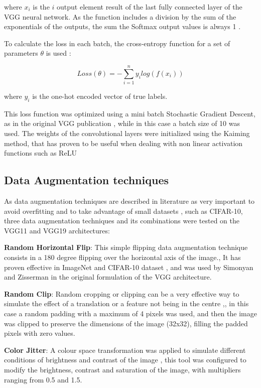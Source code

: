 \documentclass[10pt,twocolumn,letterpaper]{article}
\begin{document}
where $x_i$ is the $i$ output element result of the last fully connected layer of the VGG neural network. As the function includes a division by the sum of the exponentials of the outputs, the sum the Softmax output values is always 1 \cite{Skansi2018}.

To calculate the loss in each batch, the cross-entropy function for a set of parameters $\theta$ is used \cite{Hastie2009}:

\begin{equation}
	{Loss}(\theta) = - \sum_{i=1}^{n} y_i log(f(x_i))
\end{equation}

where $y_i$ is the one-hot encoded vector of true labels. 

This loss function was optimized using a mini batch Stochastic Gradient Descent, as in the original VGG publication \cite{Simonyan2015}, while in this case a batch size of 10 was used. The weights of the convolutional layers were initialized using the Kaiming method, that has proven to be useful when dealing with non linear activation functions such as ReLU \cite{He2015}

\subsection{Data Augmentation techniques}

As data augmentation techniques are described in literature as very important to avoid overfitting and to take advantage of small datasets \cite{Shorten2019}, such as CIFAR-10, three data augmentation techniques and its combinations were tested on the VGG11 and VGG19 architectures:

\textbf{Random Horizontal Flip}: This simple flipping data augmentation technique consists in a 180 degree flipping over the horizontal axis of the image., It has proven effective in ImageNet and CIFAR-10 dataset \cite{Shorten2019}, and was used by Simonyan and Zisserman \cite{Simonyan2015} in the original formulation of the VGG architecture.

\textbf{Random Clip}: Random cropping or clipping can be a very effective way to simulate the effect of a translation or a feature not being in the centre \cite{Shorten2019},, in this case a random padding with a maximum of 4 pixels was used, and then the image was clipped to preserve the dimensions of the image (32x32), filling the padded pixels with zero values.

\textbf{Color Jitter}: A colour space transformation was applied to simulate different conditions of brightness and contrast of the image \cite{Shorten2019}, this tool was configured to modify the brightness, contrast and saturation of the image, with multipliers ranging from 0.5 and 1.5.
\end{document}
